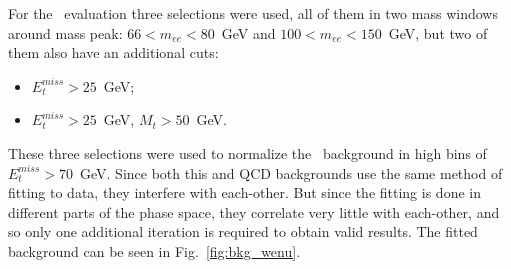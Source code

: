For the \Wenu\ evaluation three selections were used, all of them in two mass windows around mass peak: $66 < m_{ee} < 80$~GeV and $100 < m_{ee} < 150$~GeV, but two of them also have an additional cuts:
\begin{itemize}
\item $E_{t}^{miss} > 25$~GeV;
\item $E_{t}^{miss} > 25$~GeV, $M_{t} > 50$~GeV.
\end{itemize}
These three selections were used to normalize the \Wenu\ background in high bins of $E_{t}^{miss} > 70$~GeV. Since both this and QCD backgrounds use the same method of fitting to data, they interfere with each-other. But since the fitting is done in different parts of the phase space, they correlate very little with each-other, and so only one additional iteration is required to obtain valid results. The fitted background can be seen in Fig.~\ref{fig:bkg_wenu}.

\begin{figure}
\end{figure}


